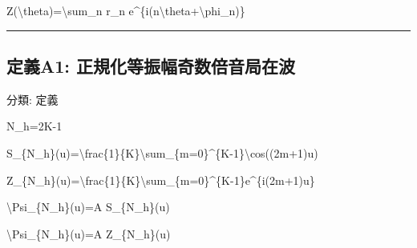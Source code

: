 \documentclass[
  a4paper]{ltjsarticle}
\newenvironment{Shaded}{}{}
\newcommand{\NormalTok}[1]{#1}
\begin{document}
\begin{Shaded}
\begin{Highlighting}[]
\NormalTok{Z(\textbackslash{}theta)=\textbackslash{}sum\_n r\_n e\^{}\{i(n\textbackslash{}theta+\textbackslash{}phi\_n)\}}
\end{Highlighting}
\end{Shaded}

\begin{center}\rule{0.5\linewidth}{0.5pt}\end{center}

\subsection{定義A1:
正規化等振幅奇数倍音局在波}\label{ux5b9aux7fa9a1-ux6b63ux898fux5316ux7b49ux632fux5e45ux5947ux6570ux500dux97f3ux5c40ux5728ux6ce2}

分類: 定義

\begin{Shaded}
\begin{Highlighting}[]
\NormalTok{N\_h=2K{-}1}
\end{Highlighting}
\end{Shaded}

\begin{Shaded}
\begin{Highlighting}[]
\NormalTok{S\_\{N\_h\}(u)=\textbackslash{}frac\{1\}\{K\}\textbackslash{}sum\_\{m=0\}\^{}\{K{-}1\}\textbackslash{}cos((2m+1)u)}
\end{Highlighting}
\end{Shaded}

\begin{Shaded}
\begin{Highlighting}[]
\NormalTok{Z\_\{N\_h\}(u)=\textbackslash{}frac\{1\}\{K\}\textbackslash{}sum\_\{m=0\}\^{}\{K{-}1\}e\^{}\{i(2m+1)u\}}
\end{Highlighting}
\end{Shaded}

\begin{Shaded}
\begin{Highlighting}[]
\NormalTok{\textbackslash{}Psi\_\{N\_h\}(u)=A S\_\{N\_h\}(u)}
\end{Highlighting}
\end{Shaded}

\begin{Shaded}
\begin{Highlighting}[]
\NormalTok{\textbackslash{}Psi\_\{N\_h\}(u)=A Z\_\{N\_h\}(u)}
\end{Highlighting}
\end{Shaded}
\end{document}
